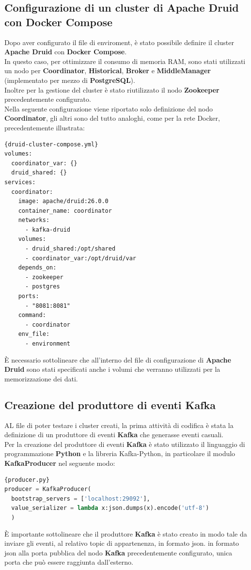 \subsection{Configurazione di un cluster di Apache Druid con Docker Compose}
Dopo aver configurato il file di \gls{enviroment}{}, 
è stato possibile definire il \gls{cluster}{} \textbf{Apache Druid} con \textbf{Docker Compose}.\\
In questo caso, per ottimizzare il consumo di memoria RAM, sono stati utilizzati un nodo per \textbf{Coordinator}, \textbf{Historical}, \textbf{Broker} e \textbf{MiddleManager} (implementato per mezzo di \textbf{PostgreSQL}).\\
Inoltre per la gestione del \gls{cluster}{} è stato riutilizzato il nodo \textbf{Zookeeper} precedentemente configurato. \\
Nella seguente configurazione viene riportato solo definizione del nodo \textbf{Coordinator}, gli altri sono del tutto analoghi, come per la rete \gls{Docker}{}, precedentemente illustrata:
\pagebreak
\begin{lstlisting}[caption=\texttt{druid-cluster-compose.yml}, label=lst:file]{druid-cluster-compose.yml}
volumes:
  coordinator_var: {}
  druid_shared: {}
services:
  coordinator:
    image: apache/druid:26.0.0
    container_name: coordinator
    networks:
      - kafka-druid
    volumes:
      - druid_shared:/opt/shared
      - coordinator_var:/opt/druid/var
    depends_on:
      - zookeeper
      - postgres
    ports:
      - "8081:8081"
    command:
      - coordinator
    env_file:
      - environment
\end{lstlisting}
È necessario sottolineare che all'interno del file di configurazione di \textbf{Apache Druid} sono stati specificati anche i \gls{volumi}{} che verranno utilizzati per la memorizzazione dei dati.
\pagebreak

\subsection{Creazione del produttore di eventi Kafka}
AL file di poter testare i \gls{cluster}{} creati, la prima attività di codifica è stata la definizione di
un produttore di eventi \textbf{Kafka} che generasse eventi casuali.\\
Per la creazione del produttore di eventi \textbf{Kafka} è stato utilizzato il linguaggio di programmazione \textbf{Python} e la libreria \gls{Kafka-Python}{}, in particolare il modulo \textbf{KafkaProducer} nel seguente modo:
\begin{lstlisting}[language=Python, caption=\texttt{producer.py}, label=lst:file]{producer.py}
producer = KafkaProducer(  
  bootstrap_servers = ['localhost:29092'],  
  value_serializer = lambda x:json.dumps(x).encode('utf-8')  
  )  
\end{lstlisting}
È importante sottolineare che il produttore \textbf{Kafka} è stato creato in modo tale da inviare gli eventi, al relativo \gls{topic}{} di appartenenza, in formato \gls{json}{}.
 in formato \gls{json}{} alla porta pubblica 
del nodo \textbf{Kafka} precedentemente configurato, unica porta che può essere raggiunta dall'esterno.\\
\pagebreak
